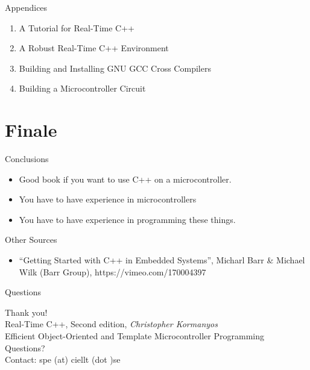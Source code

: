 \documentclass{beamer}
\begin{document}
\begin{frame}{Appendices}
  \begin{enumerate}[A]
  \item A Tutorial for Real-Time C++
  \item A Robust Real-Time C++ Environment
  \item Building and Installing GNU GCC Cross Compilers
  \item Building a Microcontroller Circuit
  \end{enumerate}
\end{frame}



\section{Finale}

\begin{frame}{Conclusions}
\begin{itemize}
\item Good book if you want to use C++ on a microcontroller.
  \pause\item You have to have experience in microcontrollers
  \pause \item You have to have experience in programming these things.
\end{itemize}
\end{frame}


\begin{frame}{Other Sources}
  \begin{itemize}
  \item ``Getting Started with C++ in Embedded Systems'',
    Micharl Barr \& Michael Wilk (Barr Group), https://vimeo.com/170004397
  \end{itemize}
\end{frame}

\begin{frame}{Questions}
\begin{center}
  \Large Thank you! \normalsize\\
  \vspace{5mm}
  Real-Time C++, Second edition, \emph{Christopher Kormanyos} \\
  \tiny Efficient Object-Oriented and Template Microcontroller Programming \\
  \vspace{5mm}
  \normalsize Questions? \\
  \vspace{3mm}
  Contact: spe (at) ciellt (dot )se

\end{center}
\end{frame}


\end{document}
